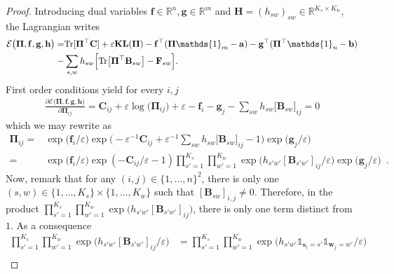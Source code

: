 \documentclass{article}
\newcommand{\kl}{\mathbf{KL}}
\theoremstyle{definition}
\begin{document}
\begin{proof}
        Introducing dual variables $\mathbf{f} \in \mathbb{R}^{n}, \mathbf{g}\in \mathbb{R}^m $ and $\mathbf{H} =(h_{sw})_{sw}\in \mathbb{R}^{K_s \times K_w }$, the Lagrangian writes 
        \begin{align*}
            \mathcal{E}\big(\mathbf{\Pi},\mathbf{f},\mathbf{g},\mathbf{h}\big) = &\textnormal{Tr}[\mathbf{\Pi}^\top \mathbf{C}] + \varepsilon \kl(\mathbf{\Pi}) - \mathbf{f}^\top(\mathbf{\Pi}\mathds{1}_{m} - \mathbf{a}) - \mathbf{g}^\top(\mathbf{\Pi}^\top\mathds{1}_{n} - \mathbf{b}) \\
            - & \sum\limits_{s,w} h_{sw} \Big[\textnormal{Tr}\big[\mathbf{\Pi}^\top\mathbf{B}_{sw}\big]-\mathbf{F}_{sw}\Big].
        \end{align*}
        First order conditions yield for every $i,j$
        \begin{align*}
            \frac{\partial \mathcal{E}\big(\mathbf{\Pi},\mathbf{f},\mathbf{g},\mathbf{h}\big)}{\partial \mathbf{\Pi}_{ij}} = \mathbf{C}_{ij} + \varepsilon\log\big(\mathbf{\Pi}_{ij}\big) + \varepsilon- \mathbf{f}_i - \mathbf{g}_j - \sum\limits_{sw}h_{sw} \big[\mathbf{B}_{sw}\big]_{ij}
            = 0
        \end{align*}
        which we may rewrite as 
        \begin{align*}
            \mathbf{\Pi}_{ij} = & \exp\big(\mathbf{f}_i/\varepsilon\big) \exp\Big(-\varepsilon^{-1}\mathbf{C}_{ij} + \varepsilon^{-1}\sum\limits_{sw}h_{sw}  \big[\mathbf{B}_{sw}\big]_{ij}-1\Big) \exp\big(\mathbf{g}_j/\varepsilon\big)\\
            =&\exp\big(\mathbf{f}_i/\varepsilon\big) \exp(-\mathbf{C}_{ij}/\varepsilon-1)\prod_{s'=1}^{K_s}  \prod_{w'=1}^{K_w} \exp\big(h_{s'w'} [\mathbf{B}_{s'w'}]_{ij}  / \varepsilon\big)\exp\big(\mathbf{g}_j/\varepsilon\big)\enspace.
        \end{align*}
        Now, remark  that for any $(i,j)\in\{1,\dots,n\}^2$, there is only one $(s,w)\in\{1,\dots,K_s\}\times\{1,\dots,K_w\}$ such that $[\mathbf{B}_{sw}]_{i,j} \neq 0$. Therefore, in the product $\prod_{s'=1}^{K_s}  \prod_{w'=1}^{K_w} \exp\big(h_{s'w'}[\mathbf{B}_{s'w'}]_{ij}\big) $, there is only one term distinct from $1$. As a consequence
        \begin{align*}
            \prod_{s'=1}^{K_s}  \prod_{w'=1}^{K_w} \exp\big(h_{s'w'}[\mathbf{B}_{s'w'}]_{ij}  / \varepsilon\big) &= \prod_{s'=1}^{K_s}  \prod_{w'=1}^{K_w} \exp\big(h_{s'w'} \mathds{1}_{\mathbf{s}_i=s'}\mathds{1}_{\mathbf{w}_j=w'}/ \varepsilon\big) \\

\end{align*}
\end{proof}
\end{document}
